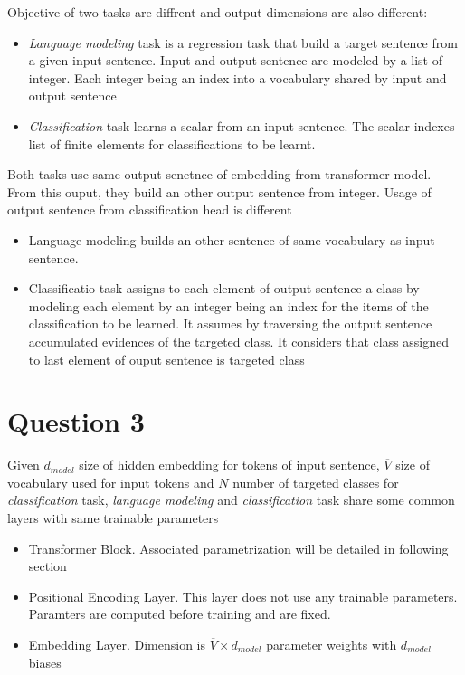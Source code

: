 \documentclass[a4paper]{article}
\begin{document}
Objective of two tasks are diffrent and output dimensions are also different:
\begin{itemize}
\item \textit{Language modeling} task is a regression task that build a target sentence from a given input sentence. Input and output sentence are modeled by a list of integer. Each integer being an index into a vocabulary shared by input and output sentence
\item \textit{Classification} task learns a scalar from an input sentence. The scalar indexes list of finite elements for classifications to be learnt.
\end{itemize}
Both tasks use same output senetnce of embedding from transformer model. From this ouput, they build an other output sentence from integer. Usage of output sentence from classification head is different
\begin{itemize}
\item Language modeling builds an other sentence of same vocabulary as input sentence.
\item Classificatio task assigns to each element of output sentence a class by modeling each element by an integer being an index for the items of the classification to be learned. It assumes by traversing the output sentence accumulated evidences of the targeted class. It considers that class assigned to last element of ouput sentence is targeted class
\end{itemize}

\section{Question 3}

Given $d_{model}$ size of hidden embedding for tokens of input sentence, $\overline{V}$ size of vocabulary used for input tokens and $N$ number of targeted classes for \textit{classification} task,  \textit{language modeling} and \textit{classification} task share some common layers with same trainable parameters 
\begin{itemize}
\item Transformer Block. Associated parametrization will be detailed in following section
\item Positional Encoding Layer. This layer does not use any trainable parameters. Paramters are computed before training and are fixed. 
\item Embedding Layer. Dimension is $\overline{V} \times d_{model}$ parameter weights with $d_{model}$ biases
\end{itemize}
\end{document}
